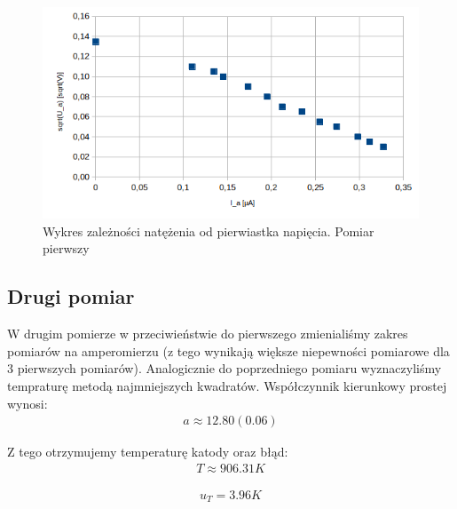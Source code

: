 \documentclass[a4paper]{article}
\begin{document}
\begin{figure}[h!]
	\includegraphics[scale=1]{T1_Ia_sqrtU}
	\centering
	\caption{Wykres zależności natężenia od pierwiastka napięcia. Pomiar pierwszy}
\end{figure}

\newpage
\subsection{Drugi pomiar}
W drugim pomierze w przeciwieństwie do pierwszego zmienialiśmy zakres pomiarów na amperomierzu (z tego wynikają większe niepewności pomiarowe dla 3 pierwszych pomiarów). Analogicznie do poprzedniego pomiaru wyznaczyliśmy tempraturę metodą najmniejszych kwadratów. Współczynnik kierunkowy prostej wynosi:
\begin{align*}
a \approx 12.80 (0.06)
\end{align*}

Z tego otrzymujemy temperaturę katody oraz błąd:
\begin{align*}
T \approx 906.31 K
\end{align*}

\begin{align*}
u_{T} = 3.96 K
\end{align*}
\end{document}
